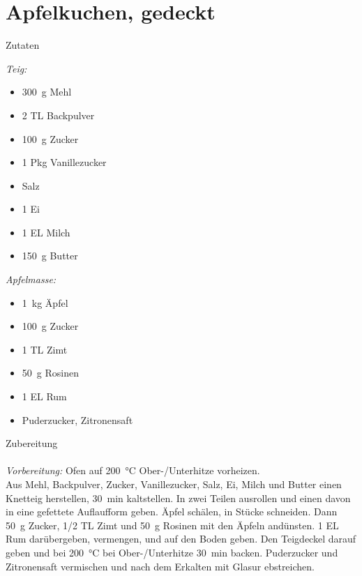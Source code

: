\section*{Apfelkuchen, gedeckt}
\ihead{}\ohead{}
\cfoot{}
{\Large Zutaten}
\begin{multicols}{2}
\textit{Teig:}
\begin{itemize}
    \item \SI{300}{g} Mehl
    \item \num{2} TL Backpulver
    \item \SI{100}{g} Zucker
    \item \num{1} Pkg Vanillezucker
    \item Salz
    \item \num{1} Ei
    \item \num{1} EL Milch
    \item \SI{150}{g} Butter
\end{itemize}
\textit{Apfelmasse:}
\begin{itemize}
    \item \SI{1}{kg} Äpfel
    \item \SI{100}{g} Zucker
    \item \num{1} TL Zimt
    \item \SI{50}{g} Rosinen
    \item \num{1} EL Rum
    \item Puderzucker, Zitronensaft
\end{itemize}
\end{multicols}
\noindent
{\Large Zubereitung}\\
\\
\textit{Vorbereitung:} Ofen auf \SI{200}{\celsius} Ober-/Unterhitze vorheizen.\\
Aus Mehl, Backpulver, Zucker, Vanillezucker, Salz, Ei, Milch und Butter einen Knetteig herstellen, \SI{30}{min} kaltstellen.
In zwei Teilen ausrollen und einen davon in eine gefettete Auflaufform geben.
Äpfel schälen, in Stücke schneiden. 
Dann \SI{50}{g} Zucker, \num{1/2} TL Zimt und \SI{50}{g} Rosinen mit den Äpfeln andünsten.
\num{1} EL Rum darübergeben, vermengen, und auf den Boden geben.
Den Teigdeckel darauf geben und bei \SI{200}{\celsius} bei Ober-/Unterhitze \SI{30}{min} backen.
Puderzucker und Zitronensaft vermischen und nach dem Erkalten mit Glasur ebstreichen. 